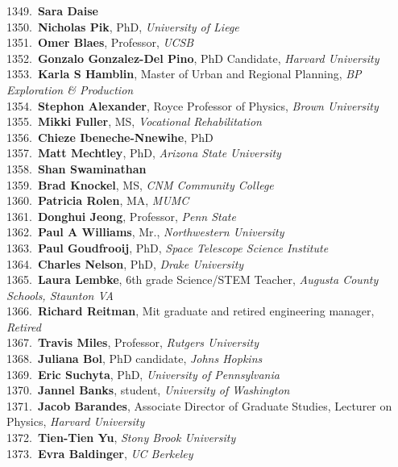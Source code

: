 1349.~{\bf Sara Daise} \\
1350.~{\bf Nicholas Pik}, PhD, {\sl University of Liege} \\
1351.~{\bf Omer Blaes}, Professor, {\sl UCSB} \\
1352.~{\bf Gonzalo Gonzalez-Del Pino}, PhD Candidate, {\sl Harvard University} \\
1353.~{\bf Karla S Hamblin}, Master of Urban and Regional Planning, {\sl BP Exploration \& Production } \\
1354.~{\bf Stephon Alexander}, Royce Professor of Physics, {\sl Brown University } \\
1355.~{\bf Mikki Fuller}, MS, {\sl Vocational Rehabilitation  } \\
1356.~{\bf Chieze Ibeneche-Nnewihe}, PhD \\
1357.~{\bf Matt Mechtley}, PhD, {\sl Arizona State University} \\
1358.~{\bf Shan Swaminathan} \\
1359.~{\bf Brad Knockel}, MS, {\sl CNM Community College} \\
1360.~{\bf Patricia Rolen}, MA, {\sl MUMC} \\
1361.~{\bf Donghui Jeong}, Professor, {\sl Penn State} \\
1362.~{\bf Paul A Williams}, Mr., {\sl Northwestern University } \\
1363.~{\bf Paul Goudfrooij}, PhD, {\sl Space Telescope Science Institute } \\
1364.~{\bf Charles Nelson}, PhD, {\sl Drake University } \\
1365.~{\bf Laura Lembke}, 6th grade Science/STEM Teacher, {\sl Augusta County Schools, Staunton VA} \\
1366.~{\bf Richard Reitman}, Mit graduate and retired engineering manager, {\sl Retired } \\
1367.~{\bf Travis Miles}, Professor, {\sl Rutgers University} \\
1368.~{\bf Juliana Bol}, PhD candidate, {\sl Johns Hopkins} \\
1369.~{\bf Eric Suchyta}, PhD, {\sl University of Pennsylvania} \\
1370.~{\bf Jannel Banks}, student, {\sl University of Washington} \\
1371.~{\bf Jacob Barandes}, Associate Director of Graduate Studies, Lecturer on Physics, {\sl Harvard University} \\
1372.~{\bf Tien-Tien Yu}, {\sl Stony Brook University} \\
1373.~{\bf Evra Baldinger}, {\sl UC Berkeley} \\
